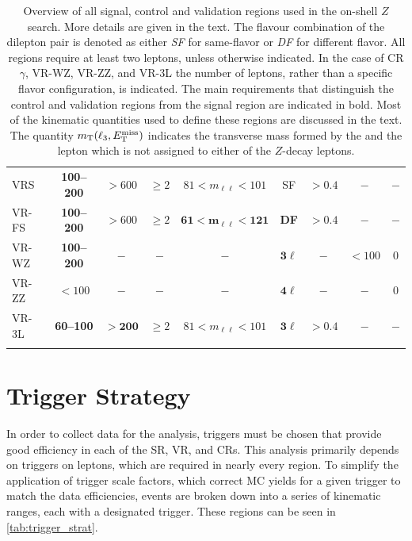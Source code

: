 \begin{table}[htbp]
\begin{center}
{\begin{tabular}{lcccccccc}
   VRS  &  {\bf 100--200}     &  $> 600 $  &  $\geq 2$  &    $81 < m_{\ell\ell} < 101$       &  SF        & $>0.4$  & $-$ & $-$ \\
   VR-FS & {\bf 100--200}     &  $> 600 $  &  $\geq 2$  &    $\mathbf{61 < m_{\ell\ell} < 121}$  &  {\bf DF}        & $>0.4$  & $-$ & $-$ \\
   VR-WZ  &  {\bf 100--200}   &     $-$      &   $-$        &         $-$                          &  $\mathbf{3\ell}$   &    $-$    & $<100$  &  $0$  \\
   VR-ZZ  &  {\bf $<100$}     &     $-$      &   $-$        &         $-$                          &  $\mathbf{4\ell}$   &    $-$    &  $-$      & $0$   \\
   VR-3L  &  {\bf 60--100}    &  $\mathbf{> 200}$  &  $\geq 2$  &   $81 < m_{\ell\ell} < 101$        &  $\mathbf{3\ell}$   & $>0.4$  & $-$ & $-$ \\
   \noalign{\smallskip}\hline\noalign{\smallskip}
\end{tabular}
} %
 \caption{Overview of all signal, control and validation regions used in the on-shell $Z$ search.
 More details are given in the text.
 The flavour combination of the dilepton pair is denoted as either \textit{SF} for same-flavor or \textit{DF} for different flavor.
 All regions require at least two leptons, unless otherwise indicated.
 In the case of CR$\gamma$, VR-WZ, VR-ZZ, and VR-3L the number of leptons, rather than a specific flavor configuration, is indicated.
The main requirements that distinguish the control and validation regions from the signal region are indicated in bold.
Most of the kinematic quantities used to define these regions are discussed in the text. The quantity $m_{\text{T}}(\ell_{3},E_{\text{T}}^{\text{miss}})$
indicates the transverse mass formed by the \met and the lepton which is not assigned to either of the $Z$-decay leptons. }
\label{tab:regions-z}
\end{center}
\end{table}

\section{Trigger Strategy}
\label{sec:trig_strategy}

In order to collect data for the analysis, triggers must be chosen that provide good efficiency in each of the \ac{SR}, \ac{VR}, and \acp{CR}. This analysis primarily depends on triggers on leptons, which are required in nearly every region. To simplify the application of trigger scale factors, which correct \ac{MC} yields for a given trigger to match the data efficiencies, events are broken down into a series of kinematic ranges, each with a designated trigger. These regions can be seen in \autoref{tab:trigger_strat}.

